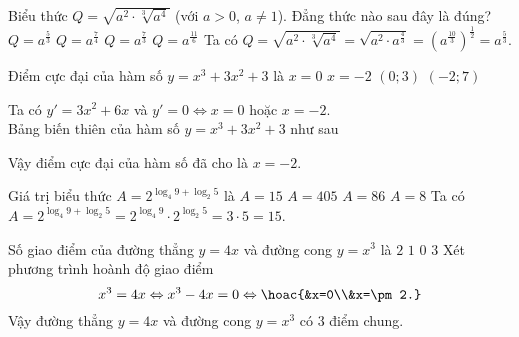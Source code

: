 \begin{ex}%
	Biểu thức $Q=\sqrt{a^2\cdot\sqrt[3]{a^4}}$ (với $a>0$, $a\ne1$). Đẳng thức nào sau đây là đúng?
	\choice
	{\True $Q=a^\frac{5}{3}$}
	{$Q=a^\frac{7}{4}$}
	{$Q=a^\frac{7}{3}$}
	{$Q=a^\frac{11}{6}$}
	\loigiai
	{
		Ta có $Q=\sqrt{a^2\cdot\sqrt[3]{a^4}}=\sqrt{a^2\cdot a^\frac{4}{3}}=\left(a^\frac{10}{3}\right)^\frac{1}{2}=a^\frac{5}{3}$.
	}
\end{ex}
\begin{ex}%
	Điểm cực đại của hàm số $y=x^3+3x^2+3$ là
	\choice
	{$x=0$}
	{\True $x=-2$}
	{$(0;3)$}
	{$(-2;7)$}
	\loigiai
	{
		Ta có $y'=3x^2+6x$ và $y'=0\Leftrightarrow x=0$ hoặc $x=-2$.\\
		Bảng biến thiên của hàm số $y=x^3+3x^2+3$ như sau
		\begin{center}
		\end{center}
		Vậy điểm cực đại của hàm số đã cho là $x=-2$.
	}
\end{ex}
\begin{ex}%
	Giá trị biểu thức $A=2^{\log_4 9+\log_2 5}$ là
	\choice
	{\True $A=15$}
	{$A=405$}
	{$A=86$}
	{$A=8$}
	\loigiai
	{
		Ta có $A=2^{\log_4 9+\log_2 5}=2^{\log_4 9}\cdot2^{\log_2 5}=3\cdot5=15$.
	}
\end{ex}
\begin{ex}%
	Số giao điểm của đường thẳng $y=4x$ và đường cong $y=x^3$ là
	\choice
	{$2$}
	{$1$}
	{$0$}
	{\True $3$}
	\loigiai
	{
		Xét phương trình hoành độ giao điểm
		\[x^3=4x\Leftrightarrow x^3-4x=0\Leftrightarrow\hoac{&x=0\\&x=\pm2.}\]
		Vậy đường thẳng $y=4x$ và đường cong $y=x^3$ có $3$ điểm chung.
	}
\end{ex}
